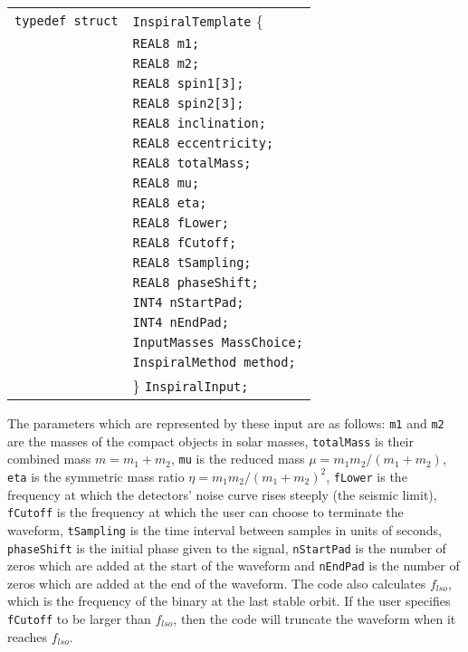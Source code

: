 \documentclass[12pt]{article}
\begin{document}
\vspace{5mm}

\begin{tabular}{ll}
\texttt{typedef struct} & \texttt{InspiralTemplate} \{ \\
                        & \texttt{REAL8 m1;} \\
                        & \texttt{REAL8 m2;}  \\
                        & \texttt{REAL8 spin1[3];}  \\
                        & \texttt{REAL8 spin2[3];}  \\
                        & \texttt{REAL8 inclination;}  \\
                        & \texttt{REAL8 eccentricity;}  \\
                        & \texttt{REAL8 totalMass;} \\
                        & \texttt{REAL8 mu;}  \\
                        & \texttt{REAL8 eta;}  \\
                        & \texttt{REAL8 fLower;}  \\
                        & \texttt{REAL8 fCutoff;}  \\
                        & \texttt{REAL8 tSampling;}  \\
                        & \texttt{REAL8 phaseShift;} \\
                        & \texttt{INT4  nStartPad;}  \\
                        & \texttt{INT4  nEndPad;}  \\
                        & \texttt{InputMasses MassChoice;}  \\
                        & \texttt{InspiralMethod method;}  \\
                        & \} \texttt{InspiralInput;}
\end{tabular}

\vspace{5mm}

The parameters which are represented by these input are as follows: \texttt{m1} and \texttt{m2} are the masses of the compact objects in solar masses, \texttt{totalMass} is their combined mass $m=m_{1}+m_{2}$, \texttt{mu} is the reduced mass $\mu=m_{1}m_{2}/(m_{1}+m_{2})$, \texttt{eta} is the symmetric mass ratio $\eta=m_{1}m_{2}/(m_{1}+m_{2})^{2}$, \texttt{fLower} is the frequency at which the detectors' noise curve rises steeply (the seismic limit), \texttt{fCutoff} is the frequency at which the user can choose to terminate the waveform, \texttt{tSampling} is the time interval between samples in units of seconds, \texttt{phaseShift} is the initial phase given to the signal, \texttt{nStartPad} is the number of zeros which are added at the start of the waveform and \texttt{nEndPad} is the number of zeros which are added at the end of the waveform. The code also calculates $f_{lso}$, which is the frequency of the binary at the last stable orbit. If the user specifies \texttt{fCutoff} to be larger than $f_{lso}$, then the code will truncate the waveform when it reaches $f_{lso}$. 
\end{document}
